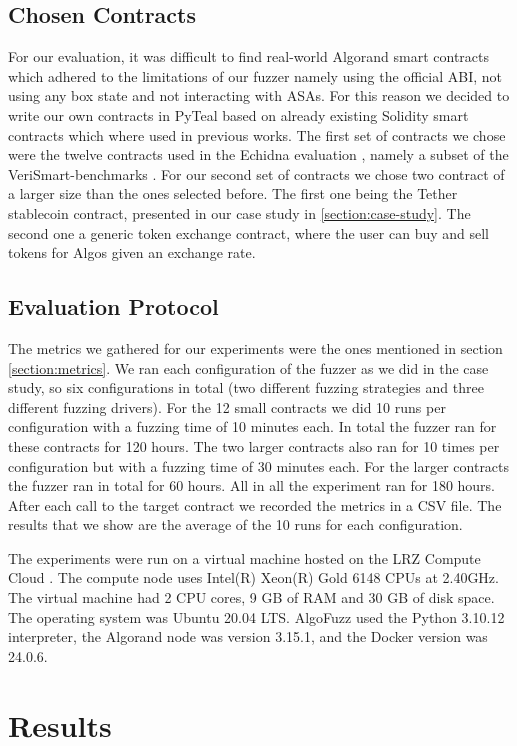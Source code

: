 \subsection*{Chosen Contracts}
For our evaluation, it was difficult to find real-world Algorand smart contracts which adhered to the limitations of our fuzzer namely using the official \ac{ABI}, not using any box state and not interacting with \acp{ASA}.
For this reason we decided to write our own contracts in PyTeal based on already existing Solidity smart contracts which where used in previous works.
The first set of contracts we chose were the twelve contracts used in the Echidna evaluation \cite{grieco_echidna_2020}, namely a subset of the VeriSmart-benchmarks \cite{noauthor_kuplverismart-benchmarks_nodate}.
For our second set of contracts we chose two contract of a larger size than the ones selected before.
The first one being the Tether stablecoin contract, presented in our case study in \ref{section:case-study}.
The second one a generic token exchange contract, where the user can buy and sell tokens for Algos given an exchange rate.

\subsection*{Evaluation Protocol}
The metrics we gathered for our experiments were the ones mentioned in section \ref{section:metrics}.
We ran each configuration of the fuzzer as we did in the case study, so six configurations in total (two different fuzzing strategies and three different fuzzing drivers).
For the 12 small contracts we did 10 runs per configuration with a fuzzing time of 10 minutes each.
In total the fuzzer ran for these contracts for 120 hours.
The two larger contracts also ran for 10 times per configuration but with a fuzzing time of 30 minutes each.
For the larger contracts the fuzzer ran in total for 60 hours.
All in all the experiment ran for 180 hours. After each call to the target contract we recorded the metrics in a \acs{CSV} file. The results that we show are the average of the 10 runs for each configuration.

The experiments were run on a virtual machine hosted on the LRZ Compute Cloud \cite{noauthor_lrz_nodate}.
The compute node uses Intel(R) Xeon(R) Gold 6148 CPUs at 2.40GHz.
The virtual machine had 2 CPU cores, 9 GB of RAM and 30 GB of disk space.
The operating system was Ubuntu 20.04 LTS.
AlgoFuzz used the Python 3.10.12 interpreter, the Algorand node was version 3.15.1, and the Docker version was 24.0.6.

\section{Results}